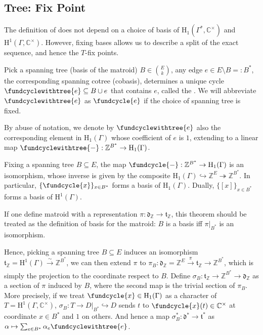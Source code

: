 \documentclass[b5paper]{article}
\newcommand{\ZZ}{\mathbb{Z}}
\newcommand{\del}{\setminus}
\newcommand{\HH}{\mathrm{H}}
\begin{document}
\subsection{Tree: Fix Point}

The definition of  does not depend on a choice of basis of $\HH_1(\Gamma^*,\mathbb{C}^\times )$ and $\HH^1(\Gamma,\mathbb{C}^\times )$. However, fixing bases allows us to describe a split of the exact sequence, and hence the $T$-fix points.

\begin{definition}[def:]{}
  Pick a spanning tree (basis of the matroid) $B\in \binom{E}{k}$, any edge $e\in E\del B=:B^*$, the corresponding spanning cotree (cobasis), determines a unique cycle $\fundcyclewithtree{e}\subseteq B\cup e$ that contains $e$, called the .
  We will abbreviate $\fundcyclewithtree{e}$ as $\fundcycle{e}$ if the choice of spanning tree is fixed.
\end{definition}
By abuse of notation, we denote by $\fundcyclewithtree{e}$ also the corresponding element in $\HH_1(\Gamma)$ whose coefficient of $e$ is $1$, extending to a linear map $ \fundcyclewithtree{-} : \ZZ^{B^*} \to \HH_1(\Gamma) $. 

\begin{theorem}{}
  Fixing a spanning tree $B \subseteq E$, the map $ \fundcycle{-}: \ZZ^{B^*} \to \HH_1(\Gamma) $ is an isomorphism, whose inverse is given by the composite $ \HH_1(\Gamma) \hookrightarrow \ZZ^E \twoheadrightarrow \ZZ^{B^*} $. 
  In particular, $\{\fundcycle{x}\}_{x \in B^*}$ forms a basis of $\HH_1(\Gamma)$. Dually, $\{[x]\}_{x \in B^*}$ forms a basis of $\HH^1(\Gamma)$. 
  \begin{remark}
    If one define matroid with a representation $\pi:\mathfrak{d}_\mathbb{Z}\rightarrow \mathfrak{t}_\mathbb{Z}$, this theorem should be treated as the definition of basis for the matroid: $B$ is a basis iff $\pi|_{B^*}$ is an isomorphism.
  \end{remark}
\end{theorem}

Hence, picking a spanning tree $B\subseteq E$ induces an isomorphism $\mathfrak{t}_\mathbb{Z}=\HH^1(\Gamma) \xrightarrow[]{\sim }\mathbb{Z}^{B^*}$, we can then extend $\pi$ to $\pi_B:\mathfrak{d}_\mathbb{Z}=\mathbb{Z}^E\xrightarrow[]{\pi} \mathfrak{t}_\mathbb{Z}\rightarrow \mathbb{Z}^{B^*}$, which is simply the projection to the coordinate respect to $B$. Define $\sigma_B:\mathfrak{t}_\mathbb{Z}\rightarrow \mathbb{Z}^{B^*}\rightarrow \mathfrak{d}_\mathbb{Z}$ as a section of $\pi$ induced by $B$, where the second map is the trivial section of $\pi_B$.
More precisely, if we treat $\fundcycle{x}\in \HH_1(\Gamma)$ as a character of $T=\HH^1(\Gamma,\mathbb{C}^\times )$, $\sigma_B:T\rightarrow D|_{B^*}\hookrightarrow D$ sends $t$ to $\fundcycle{x}(t)\in \mathbb{C}^\times $ at coordinate ${x\in B^*}$ and $1$ on others. And hence a map $\sigma_B^*:\mathfrak{d}^*\rightarrow \mathfrak{t}^*$ as $\alpha\mapsto \sum_{e\in B^*}^{}\alpha_e\fundcyclewithtree{e}$.
\end{document}
